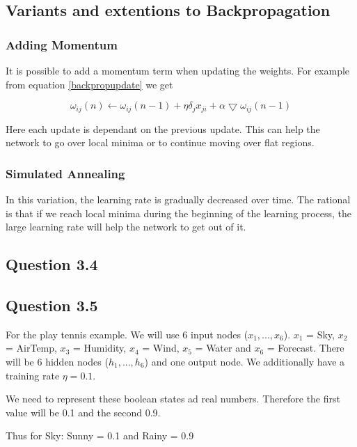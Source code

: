 \documentclass[10pt,a4paper]{article}
\begin{document}
\subsection{Variants and extentions to Backpropagation}

\subsubsection{Adding Momentum}

It is possible to add a momentum term when updating the weights. For example from equation \ref{backpropupdate} we get

\begin{equation}
\omega_{ij}(n) \leftarrow \omega_{ij}(n-1) + \eta \delta_j x_{ji} + \alpha\bigtriangledown\omega_{ij}(n-1)
\end{equation}

Here each update is dependant on the previous update. This can help the network to go over local minima or to continue moving over flat regions. \citep[p100]{Michell2009}

\subsubsection{Simulated Annealing}

In this variation, the learning rate is gradually decreased over time. The rational is that if we reach local minima during the beginning of the learning process, the large learning rate will help the network to get out of it. \citep{nils}
\subsection{Question 3.4}

\subsection{Question 3.5}

For the play tennis example. We will use 6 input nodes ($x_1,...,x_6$). $x_1$ = Sky, $x_2$ = AirTemp, $x_3$ = Humidity, $x_4$ = Wind, $x_5$ = Water and $x_6$ = Forecast. There will be 6 hidden nodes ($h_1,...,h_6$) and one output node. We additionally have a training rate $\eta = 0.1$.

We need to represent these boolean states ad real numbers. Therefore the first value will be 0.1 and the second 0.9. 

Thus for Sky: Sunny = 0.1 and Rainy = 0.9 
\end{document}
